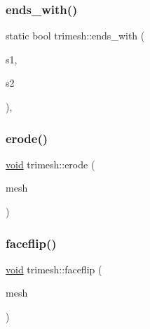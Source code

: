 \subsubsection{\texorpdfstring{ends\+\_\+with()}{ends\_with()}\hspace{0.1cm}{\footnotesize\ttfamily [2/2]}}
{\footnotesize\ttfamily static bool trimesh\+::ends\+\_\+with (\begin{DoxyParamCaption}\item[{const \+::std\+::string \&}]{s1,  }\item[{const \+::std\+::string \&}]{s2 }\end{DoxyParamCaption})\hspace{0.3cm}{\ttfamily [inline]}, {\ttfamily [static]}}

\mbox{\label{namespacetrimesh_a8376ba0b1555d2d21aedd51e78b219fe}} 
\subsubsection{\texorpdfstring{erode()}{erode()}}
{\footnotesize\ttfamily \hyperlink{namespacetrimesh_a784ddfd979e1c579bda795a8edfc3f43}{void} trimesh\+::erode (\begin{DoxyParamCaption}\item[{\hyperlink{classtrimesh_1_1TriMesh}{Tri\+Mesh} $\ast$}]{mesh }\end{DoxyParamCaption})}

\mbox{\label{namespacetrimesh_af304d7d230cbf6775650f317ce2c85d3}} 
\subsubsection{\texorpdfstring{faceflip()}{faceflip()}}
{\footnotesize\ttfamily \hyperlink{namespacetrimesh_a784ddfd979e1c579bda795a8edfc3f43}{void} trimesh\+::faceflip (\begin{DoxyParamCaption}\item[{\hyperlink{classtrimesh_1_1TriMesh}{Tri\+Mesh} $\ast$}]{mesh }\end{DoxyParamCaption})}

\mbox{\label{namespacetrimesh_a141b94a1ad9768323d4d3706008452bb}} 
